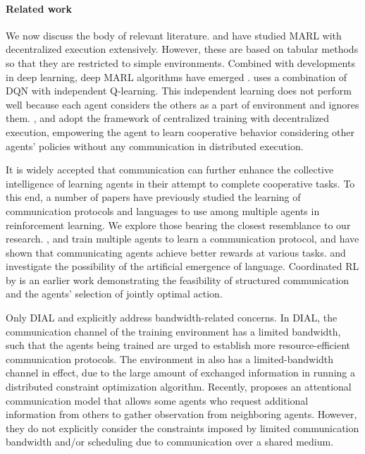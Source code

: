 \documentclass{article} %
\newcommand{\myparagraph}[1]{\vspace{-0.25cm} \paragraph{#1}}
\begin{document}
\myparagraph{Related work} We now discuss the body of relevant
literature. \citet{busoniu2008} and \citet{iql} have studied MARL with
decentralized execution extensively. However, these are based on
tabular methods so that they are restricted to simple environments.
Combined with developments in deep learning, deep MARL algorithms have
emerged \citep{tampuu2017multiagent, coma, lowe2017multi}.
\citet{tampuu2017multiagent} uses a combination of DQN with
independent Q-learning. This independent learning does not perform
well because each agent considers the others as a part of environment
and ignores them. \citet{coma, lowe2017multi, gupta2017cooperative,
  vdn}, and \citet{foerster2017stabilising} adopt the framework of centralized training with
decentralized execution, empowering the agent to learn cooperative
behavior considering other agents' policies without any communication
in distributed execution.

It is widely accepted that communication can further enhance the
collective intelligence of learning agents in their attempt to
complete cooperative tasks. To this end, a number of papers have
previously studied the learning of communication protocols and
languages to use among multiple agents in reinforcement learning. We
explore those bearing the closest resemblance to our research.
\citet{dial,commnet,bicnet, guestrin2002}, and \citet{zhang2013} train multiple
agents to learn a communication protocol, and have shown that
communicating agents achieve better rewards at various tasks.  \citet
{mordatch2017grounded} and \citet{havrylov2017} investigate the possibility of the
artificial emergence of language. Coordinated RL by
\citet{guestrin2002} is an earlier work demonstrating the feasibility
of structured communication and the agents' selection of jointly
optimal action.

Only DIAL \citep{dial} and \citet{zhang2013} explicitly address
bandwidth-related concerns. In DIAL, the communication channel of the
training environment has a limited bandwidth, such that the agents
being trained are urged to establish more resource-efficient
communication protocols. The environment in \citet{zhang2013} also has
a limited-bandwidth channel in effect, due to the large amount of
exchanged information in running a distributed constraint optimization
algorithm. Recently, \citet{attentional_comm} proposes an attentional communication model
that allows some agents who request additional information from others to
gather observation from neighboring agents. However, they
do not explicitly consider the constraints imposed by limited communication bandwidth and/or scheduling due to communication over a shared medium.
\end{document}
